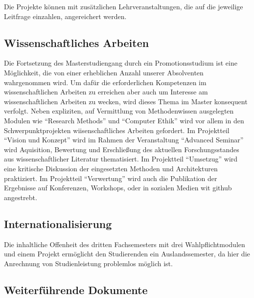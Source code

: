 Die Projekte können mit zusätzlichen Lehrveranstaltungen, die auf die
jeweilige Leitfrage einzahlen, angereichert werden.

\subsection{Wissenschaftliches
Arbeiten}\label{wissenschaftliches-arbeiten-1}

Die Fortsetzung des Masterstudiengang durch ein Promotionsstudium ist
eine Möglichkeit, die von einer erheblichen Anzahl unserer Absolventen
wahrgenommen wird. Um dafür die erforderlichen Kompetenzen im
wissenschaftlichen Arbeiten zu erreichen aber auch um Interesse am
wissenschaftlichen Arbeiten zu wecken, wird dieses Thema im Master
konsequent verfolgt. Neben expliziten, auf Vermittlung von
Methodenwissen ausgelegten Modulen wie ``Research Methods'' und
``Computer Ethik'' wird vor allem in den Schwerpunktprojekten
wiisenschaftliches Arbeiten gefordert. Im Projektteil ``Vision und
Konzept'' wird im Rahmen der Veranstaltung ``Advanced Seminar'' wird
Aquisition, Bewertung und Erschließung des aktuellen Forschungsstandes
aus wissenschaftlicher Literatur thematisiert. Im Projektteil
``Umsetzug'' wird eine kritische Diskussion der eingesetzten Methoden
und Architekturen praktiziert. Im Projektteil ``Verwertung'' wird auch
die Publikation der Ergebnisse auf Konferenzen, Workshops, oder in
sozialen Medien wit github angestrebt.

\subsection{Internationalisierung}\label{internationalisierung}

Die inhaltliche Offenheit des dritten Fachsemesters mit drei
Wahlpflichtmodulen und einem Projekt ermöglicht den Studierenden ein
Auslandssemester, da hier die Anrechnung von Studienleistung problemlos
möglich ist.

\subsection{Weiterführende
Dokumente}\label{weiterfuxfchrende-dokumente-4}

